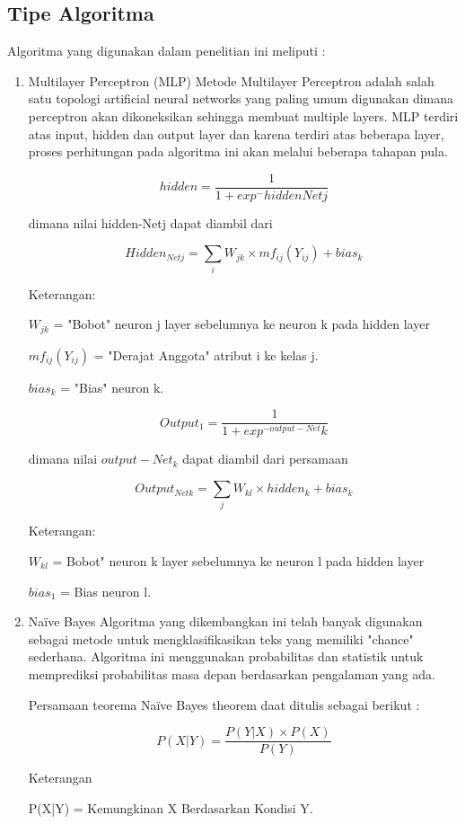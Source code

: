 \documentclass{article}
\begin{document}
\subsection{Tipe Algoritma}
Algoritma yang digunakan dalam penelitian ini meliputi :
\begin{enumerate}[{a.}]
\item Multilayer Perceptron (MLP)
Metode Multilayer Perceptron adalah salah satu topologi artificial neural networks 
yang paling umum digunakan dimana perceptron akan dikoneksikan sehingga 
membuat multiple layers. MLP terdiri atas input, hidden dan output layer dan karena 
terdiri atas beberapa layer, proses perhitungan pada algoritma ini akan melalui beberapa 
tahapan pula.

$$ hidden=\frac{1}{1+exp^ -hiddenNet j}$$

dimana nilai hidden-Netj dapat diambil dari

$$ Hidden_{Netj} = \sum _{i}W_{jk}\times mf_{ij}(Y_{ij})+ bias_{k} $$

Keterangan:

$ W_{jk} $ = "Bobot" neuron j layer sebelumnya ke neuron k pada hidden layer

$ mf_{ij} (Y_{ij}) $ = "Derajat Anggota" atribut i ke kelas j.

$ bias_k $ = "Bias" neuron k.

$$ Output_1 = \frac{1}{1+exp^{-output-Net}k} $$

dimana nilai $ output-Net_k $ dapat diambil dari persamaan

$$ Output_{Netk} = \sum _{j}W_{kl}\times hidden_k + bias_k $$

Keterangan:

$ W_{kl} $ = Bobot" neuron k layer sebelumnya ke neuron l pada hidden layer

$ bias_1 $ = Bias neuron l.

\item Naïve Bayes
Algoritma yang dikembangkan ini telah banyak digunakan sebagai metode untuk
mengklasifikasikan teks yang memiliki "chance" sederhana. Algoritma ini
menggunakan probabilitas dan statistik untuk memprediksi probabilitas masa depan
berdasarkan pengalaman yang ada.

Persamaan teorema Naïve Bayes theorem daat ditulis sebagai berikut :

$$ P(X|Y) = \frac{P(Y|X)\times P(X)}{P(Y)} $$

Keterangan

P(X|Y) = Kemungkinan X Berdasarkan Kondisi Y.


\end{enumerate}
\end{document}
